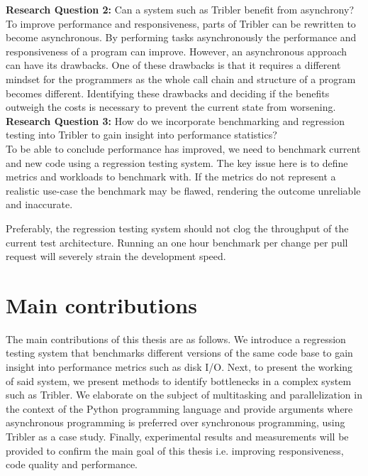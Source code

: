 \textbf{Research Question 2:} Can a system such as Tribler benefit from asynchrony?\\

To improve performance and responsiveness, parts of Tribler can be rewritten to become asynchronous.
By performing tasks asynchronously the performance and responsiveness of a program can improve.
However, an asynchronous approach can have its drawbacks. 
One of these drawbacks is that it requires a different mindset for the programmers as the whole call chain and structure of a program becomes different.
Identifying these drawbacks and deciding if the benefits outweigh the costs is necessary to prevent the current state from worsening. \\

\noindent
\textbf{Research Question 3:} How do we incorporate benchmarking and regression testing into Tribler to gain insight into performance statistics?\\

To be able to conclude performance has improved, we need to benchmark current and new code using a regression testing system.
The key issue here is to define metrics and workloads to benchmark with.
If the metrics do not represent a realistic use-case the benchmark may be flawed, rendering the outcome unreliable and inaccurate.

Preferably, the regression testing system should not clog the throughput of the current test architecture.
Running an one hour benchmark per change per pull request will severely strain the development speed.

\section{Main contributions}
The main contributions of this thesis are as follows.
We introduce a regression testing system that benchmarks different versions of the same code base to gain insight into performance metrics such as disk I/O.
Next, to present the working of said system, we present methods to identify bottlenecks in a complex system such as Tribler. 
We elaborate on the subject of multitasking and parallelization in the context of the Python programming language and provide arguments where asynchronous programming is preferred over synchronous programming, using Tribler as a case study.
Finally, experimental results and measurements will be provided to confirm the main goal of this thesis i.e. improving responsiveness, code quality and performance.
